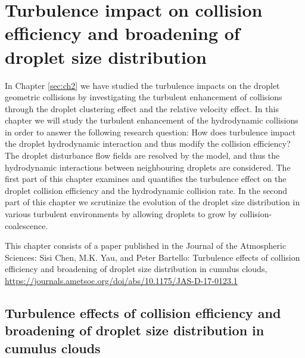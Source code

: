 \resetdatestamp

\chapter{Turbulence impact on collision efficiency and broadening of droplet size distribution}\label{sec:ch3}

In Chapter \ref{sec:ch2} we have studied the turbulence impacts on the droplet geometric collisions by investigating the turbulent enhancement of collisions through the droplet clustering effect and the relative velocity effect. In this chapter we will study the turbulent enhancement of the hydrodynamic collisions in order to answer the following research question: How does turbulence impact the droplet hydrodynamic interaction and thus modify the collision efficiency? The droplet disturbance flow fields are resolved by the model, and thus the hydrodynamic interactions between neighbouring droplets are considered. The first part of this chapter examines and quantifies the turbulence effect on the droplet collision efficiency and the hydrodynamic collision rate. In the second part of this chapter we scrutinize the evolution of the droplet size distribution in various turbulent environments by allowing droplets to grow by collision-coalescence. 

This chapter consists of a paper published in the Journal of the Atmospheric Sciences: Sisi Chen, M.K. Yau, and Peter Bartello: Turbulence effects of collision efficiency and broadening of droplet size distribution in cumulus clouds, \url{https://journals.ametsoc.org/doi/abs/10.1175/JAS-D-17-0123.1}
\newpage
\newpage

\section*{\centering Turbulence effects of collision efficiency and broadening of droplet size distribution in cumulus clouds}
\begin{center}
\author{ Sisi Chen, M. K. Yau, Peter Bartello \\  \textit{Department of Atmospheric and Oceanic Sciences, McGill University, Montr\'{e}al, Qu\'{e}bec, Canada}\\} 
\end{center}

